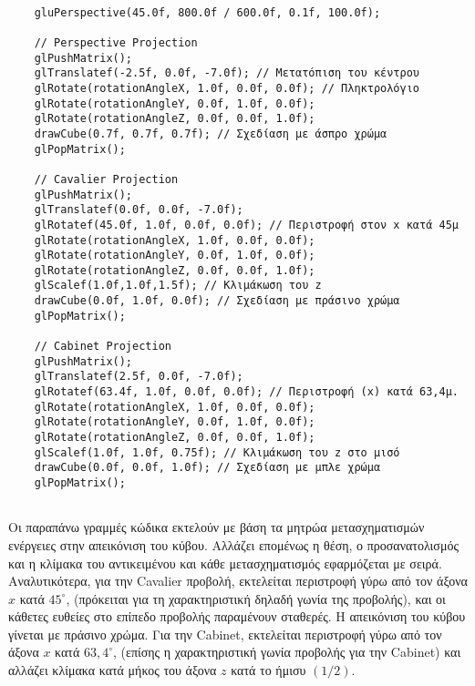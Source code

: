 \begin{verbatim}

    gluPerspective(45.0f, 800.0f / 600.0f, 0.1f, 100.0f);
    
    // Perspective Projection
    glPushMatrix();
    glTranslatef(-2.5f, 0.0f, -7.0f); // Μετατόπιση του κέντρου 
    glRotate(rotationAngleX, 1.0f, 0.0f, 0.0f); // Πληκτρολόγιο
    glRotate(rotationAngleY, 0.0f, 1.0f, 0.0f);
    glRotate(rotationAngleZ, 0.0f, 0.0f, 1.0f);
    drawCube(0.7f, 0.7f, 0.7f); // Σχεδίαση με άσπρο χρώμα
    glPopMatrix();

    // Cavalier Projection
    glPushMatrix();
    glTranslatef(0.0f, 0.0f, -7.0f); 
    glRotatef(45.0f, 1.0f, 0.0f, 0.0f); // Περιστροφή στον x κατά 45μ
    glRotate(rotationAngleX, 1.0f, 0.0f, 0.0f); 
    glRotate(rotationAngleY, 0.0f, 1.0f, 0.0f);
    glRotate(rotationAngleZ, 0.0f, 0.0f, 1.0f);
    glScalef(1.0f,1.0f,1.5f); // Κλιμάκωση του z 
    drawCube(0.0f, 1.0f, 0.0f); // Σχεδίαση με πράσινο χρώμα
    glPopMatrix();

    // Cabinet Projection
    glPushMatrix();
    glTranslatef(2.5f, 0.0f, -7.0f);  
    glRotatef(63.4f, 1.0f, 0.0f, 0.0f); // Περιστροφή (x) κατά 63,4μ. 
    glRotate(rotationAngleX, 1.0f, 0.0f, 0.0f); 
    glRotate(rotationAngleY, 0.0f, 1.0f, 0.0f);
    glRotate(rotationAngleZ, 0.0f, 0.0f, 1.0f);
    glScalef(1.0f, 1.0f, 0.75f); // Κλιμάκωση του z στο μισό 
    drawCube(0.0f, 0.0f, 1.0f); // Σχεδίαση με μπλε χρώμα
    glPopMatrix();
    
\end{verbatim} 
\par

Οι παραπάνω γραμμές κώδικα εκτελούν με βάση τα μητρώα μετασχηματισμών ενέργειες στην απεικόνιση του κύβου. Αλλάζει επομένως η θέση, ο προσανατολισμός και η κλίμακα του αντικειμένου και κάθε μετασχηματισμός εφαρμόζεται με σειρά. Αναλυτικότερα, για την Cavalier προβολή, εκτελείται περιστροφή γύρω από τον άξονα $x$ κατά $45^\circ$, (πρόκειται για τη χαρακτηριστική δηλαδή γωνία της προβολής), και οι κάθετες ευθείες στο επίπεδο προβολής παραμένουν σταθερές. Η απεικόνιση του κύβου γίνεται με πράσινο χρώμα. Για την Cabinet, εκτελείται περιστροφή γύρω από τον άξονα $x$ κατά $63,4^\circ$, (επίσης η χαρακτηριστική γωνία προβολής για την Cabinet) και αλλάζει κλίμακα κατά μήκος του άξονα $z$ κατά το ήμισυ $(1/2)$. 

